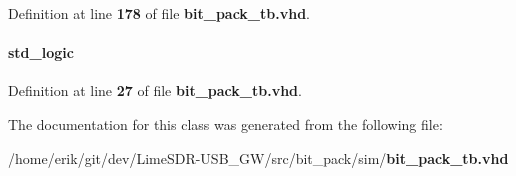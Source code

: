 Definition at line {\bf 178} of file {\bf bit\+\_\+pack\+\_\+tb.\+vhd}.

\paragraph[{reset\+\_\+n}]{ {\bfseries \textcolor{comment}{std\+\_\+logic}\textcolor{vhdlchar}{ }} \hspace{0.3cm}{\ttfamily [Signal]}}\label{classbit__pack__tb_1_1tb__behave_a58e75ee394415dfa49225782c39502e0}


Definition at line {\bf 27} of file {\bf bit\+\_\+pack\+\_\+tb.\+vhd}.



The documentation for this class was generated from the following file\+:\begin{DoxyCompactItemize}
\item 
/home/erik/git/dev/\+Lime\+S\+D\+R-\/\+U\+S\+B\+\_\+\+G\+W/src/bit\+\_\+pack/sim/{\bf bit\+\_\+pack\+\_\+tb.\+vhd}\end{DoxyCompactItemize}
